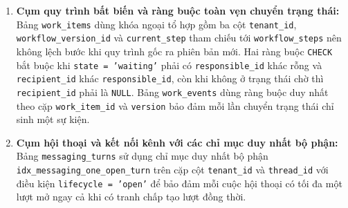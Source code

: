 \begin{enumerate}
    Trên cả \texttt{product\_\hspace{0pt}variants} lẫn \texttt{order\_\hspace{0pt}items}, cờ \texttt{price\_\hspace{0pt}provided} giúp tách biệt trạng thái chưa nhập giá khỏi đơn giá \texttt{0} đồng mà không làm thay đổi kiểu tiền tệ chính xác \texttt{numeric(15,2)}.
  \item \textbf{Cụm quy trình bất biến và ràng buộc toàn vẹn chuyển trạng thái:} Bảng \texttt{work\_\hspace{0pt}items} dùng khóa ngoại tổ hợp gồm ba cột \texttt{tenant\_\hspace{0pt}id}, \texttt{workflow\_\hspace{0pt}version\_\hspace{0pt}id} và \texttt{current\_\hspace{0pt}step} tham chiếu tới \texttt{workflow\_\hspace{0pt}steps} nên không lệch bước khi quy trình gốc ra phiên bản mới.
    Hai ràng buộc \texttt{CHECK} bắt buộc khi \texttt{state = 'waiting'} phải có \texttt{responsible\_\hspace{0pt}id} khác rỗng và \texttt{recipient\_\hspace{0pt}id} khác \texttt{responsible\_\hspace{0pt}id}, còn khi không ở trạng thái chờ thì \texttt{recipient\_\hspace{0pt}id} phải là \texttt{NULL}.
    Bảng \texttt{work\_\hspace{0pt}events} dùng ràng buộc duy nhất theo cặp \texttt{work\_\hspace{0pt}item\_\hspace{0pt}id} và \texttt{version} bảo đảm mỗi lần chuyển trạng thái chỉ sinh một sự kiện.
  \item \textbf{Cụm hội thoại và kết nối kênh với các chỉ mục duy nhất bộ phận:} Bảng \texttt{messaging\_\hspace{0pt}turns} sử dụng chỉ mục duy nhất bộ phận \texttt{idx\_\hspace{0pt}messaging\_\hspace{0pt}one\_\hspace{0pt}open\_\hspace{0pt}turn} trên cặp cột \texttt{tenant\_\hspace{0pt}id} và \texttt{thread\_\hspace{0pt}id} với điều kiện \texttt{lifecycle = 'open'} để bảo đảm mỗi cuộc hội thoại có tối đa một lượt mở ngay cả khi có tranh chấp tạo lượt đồng thời.

\end{enumerate}
